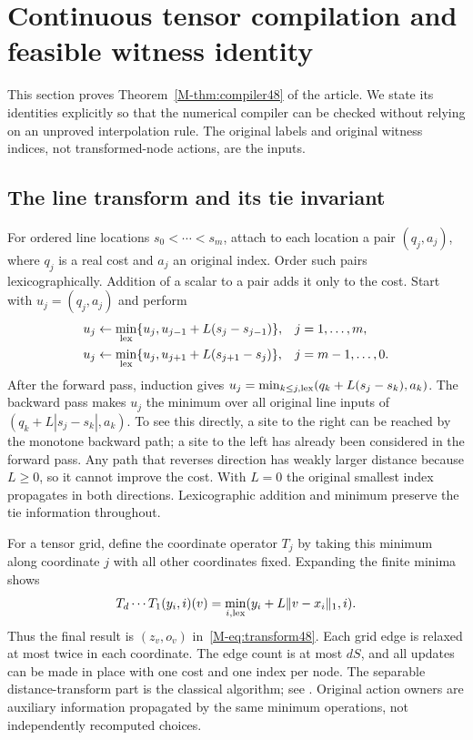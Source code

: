 \section{Continuous tensor compilation and feasible witness identity}\label{supp:compiler48}
This section proves Theorem~\ref{M-thm:compiler48} of the article. We state its identities explicitly so that the numerical compiler can be checked without relying on an unproved interpolation rule. The original labels and original witness indices, not transformed-node actions, are the inputs.

\subsection{The line transform and its tie invariant}
For ordered line locations $s_0<\cdots<s_m$, attach to each location a pair $(q_j,a_j)$, where $q_j$ is a real cost and $a_j$ an original index. Order such pairs lexicographically. Addition of a scalar to a pair adds it only to the cost. Start with $u_j=(q_j,a_j)$ and perform
\begin{align}\label{eq:line48}
 u_j&\leftarrow\min_{\rm lex}\{u_j,u_{j-1}+L(s_j-s_{j-1})\},
       &&j=1,\ldots,m,\\
 u_j&\leftarrow\min_{\rm lex}\{u_j,u_{j+1}+L(s_{j+1}-s_j)\},
       &&j=m-1,\ldots,0.\notag
\end{align}
After the forward pass, induction gives $u_j=\min_{k\le j,\rm lex}(q_k+L(s_j-s_k),a_k)$. The backward pass makes $u_j$ the minimum over all original line inputs of $(q_k+L|s_j-s_k|,a_k)$. To see this directly, a site to the right can be reached by the monotone backward path; a site to the left has already been considered in the forward pass. Any path that reverses direction has weakly larger distance because $L\ge0$, so it cannot improve the cost. With $L=0$ the original smallest index propagates in both directions. Lexicographic addition and minimum preserve the tie information throughout.

For a tensor grid, define the coordinate operator $T_j$ by taking this minimum along coordinate $j$ with all other coordinates fixed. Expanding the finite minima shows
\[
 T_d\cdots T_1(y_i,i)(v)
 =\min_{i,\rm lex}(y_i+L\|v-x_i\|_1,i).
\]
Thus the final result is $(z_v,o_v)$ in~\eqref{M-eq:transform48}. Each grid edge is relaxed at most twice in each coordinate. The edge count is at most $dS$, and all updates can be made in place with one cost and one index per node. The separable distance-transform part is the classical algorithm; see \citet{felzenszwalb2012}. Original action owners are auxiliary information propagated by the same minimum operations, not independently recomputed choices.

